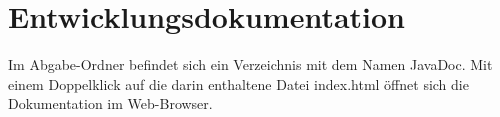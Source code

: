 \noindent%
\begin{minipage}{\linewidth}%
    \label{fig:puls-strukto}
\end{minipage}



\section{Entwicklungsdokumentation}\label{sec:entwicklerdokumentation}
Im Abgabe-Ordner befindet sich ein Verzeichnis mit dem Namen \glqq JavaDoc\grqq{}.
Mit einem Doppelklick auf die darin enthaltene Datei \glqq index.html\grqq{} öffnet sich die Dokumentation im Web-Browser.